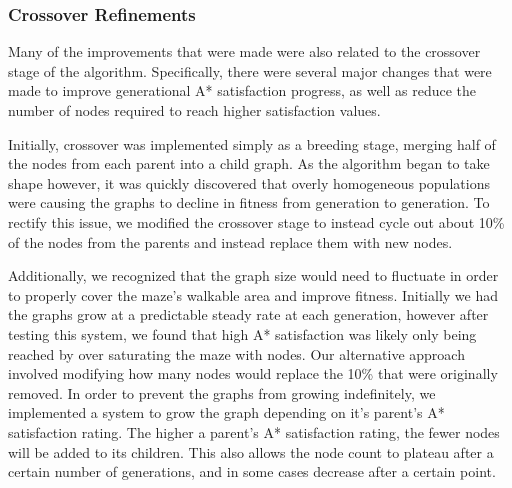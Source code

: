 	\subsubsection{Crossover Refinements}
	Many of the improvements that were made were also related to the crossover stage of the algorithm. Specifically, there were several major changes that were made to improve generational A* satisfaction progress, as well as reduce the number of nodes required to reach higher satisfaction values.
	
	Initially, crossover was implemented simply as a breeding stage, merging half of the nodes from each parent into a child graph. As the algorithm began to take shape however, it was quickly discovered that overly homogeneous populations were causing the graphs to decline in fitness from generation to generation. To rectify this issue, we modified the crossover stage to instead cycle out about 10\% of the nodes from the parents and instead replace them with new nodes.
	
	Additionally, we recognized that the graph size would need to fluctuate in order to properly cover the maze's walkable area and improve fitness. Initially we had the graphs grow at a predictable steady rate at each generation, however after testing this system, we found that high A* satisfaction was likely only being reached by over saturating the maze with nodes. Our alternative approach involved modifying how many nodes would replace the 10\% that were originally removed. In order to prevent the graphs from growing indefinitely, we implemented a system to grow the graph depending on it's parent's A* satisfaction rating. The higher a parent's A* satisfaction rating, the fewer nodes will be added to its children. This also allows the node count to plateau after a certain number of generations, and in some cases decrease after a certain point.
	
	
	
	
	
	